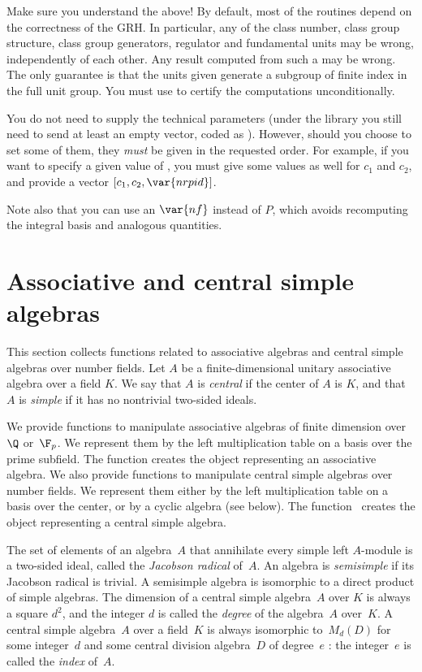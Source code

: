  Make sure you understand the above! By default, most of
the  routines depend on the correctness of the GRH. In particular,
any of the class number, class group structure, class group generators,
regulator and fundamental units may be wrong, independently of each other.
Any result computed from such a  may be wrong. The only guarantee is
that the units given generate a subgroup of finite index in the full unit
group. You must use  to certify the computations
unconditionally.


You do not need to supply the technical parameters (under the library you
still need to send at least an empty vector, coded as ). However,
should you choose to set some of them, they \emph{must} be given in the
requested order. For example, if you want to specify a given value of
, you must give some values as well for $c_1$ and $c_2$, and provide
a vector $[c_1,c_2,\var{nrpid}]$.

Note also that you can use an $\var{nf}$ instead of $P$, which avoids
recomputing the integral basis and analogous quantities.

\smallskip


\section{Associative and central simple algebras}

This section collects functions related to associative algebras and central
simple algebras over number fields. Let $A$ be a finite-dimensional unitary
associative algebra over a field $K$. We say that $A$ is \emph{central} if
the center of $A$ is $K$, and that $A$ is \emph{simple} if it has no
nontrivial two-sided ideals.

We provide functions to manipulate associative algebras of finite
dimension over~$\Q$ or~$\F_p$. We represent them by the left multiplication
table on a basis over the prime subfield. The function 
creates the object representing an associative algebra. We also provide
functions to manipulate central simple algebras over number fields. We
represent them either by the left multiplication table on a basis over the
center, or by a cyclic algebra (see below). The function~ creates
the object representing a central simple algebra.

The set of elements of an algebra~$A$ that annihilate every simple left
$A$-module is a two-sided ideal, called the \emph{Jacobson radical} of~$A$.
An algebra is \emph{semisimple} if its Jacobson radical is trivial. A
semisimple algebra is isomorphic to a direct product of simple algebras. The
dimension of a central simple algebra~$A$ over $K$ is always a square $d^2$,
and the integer $d$ is called the \emph{degree} of the algebra~$A$ over~$K$.
A central simple algebra~$A$ over a field~$K$ is always isomorphic to~$M_d(D)$
for some integer~$d$ and some central division algebra~$D$ of degree~$e$ : the
integer~$e$ is called the \emph{index} of~$A$.

